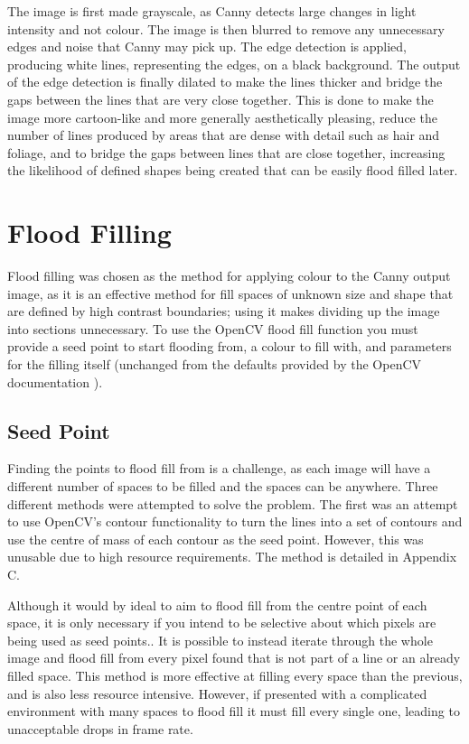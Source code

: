 The image is first made grayscale, as Canny detects large changes in light intensity and not colour. The image is then blurred to remove any unnecessary edges and noise that Canny may pick up. The edge detection is applied, producing white lines, representing the edges, on a black background. The output of the edge detection is finally dilated to make the lines thicker and bridge the gaps between the lines that are very close together. This is done to make the image more cartoon-like and more generally aesthetically pleasing, reduce the number of lines produced by areas that are dense with detail such as hair and foliage, and to bridge the gaps between lines that are close together, increasing the likelihood of defined shapes being created that can be easily flood filled later.

\section{Flood Filling}

Flood filling was chosen as the method for applying colour to the Canny output image, as it is an effective method for fill spaces of unknown size and shape that are defined by high contrast boundaries; using it makes dividing up the image into sections unnecessary. To use the OpenCV flood fill function you must provide a seed point to start flooding from, a colour to fill with, and parameters for the filling itself (unchanged from the defaults provided by the OpenCV documentation \cite{opencvffilldemo}).

\subsection{Seed Point}

Finding the points to flood fill from is a challenge, as each image will have a different number of spaces to be filled and the spaces can be anywhere. Three different methods were attempted to solve the problem. The first was an attempt to use OpenCV's contour functionality to turn the lines into a set of contours and use the centre of mass of each contour as the seed point. However, this was unusable due to high resource requirements. The method is detailed in Appendix C.

Although it would by ideal to aim to flood fill from the centre point of each space, it is only necessary if you intend to be selective about which pixels are being used as seed points.. It is possible to instead iterate through the whole image and flood fill from every pixel found that is not part of a line or an already filled space. This method is more effective at filling every space than the previous, and is also less resource intensive. However, if presented with a complicated environment with many spaces to flood fill it must fill every single one, leading to unacceptable drops in frame rate.

